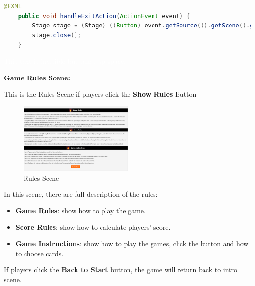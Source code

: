 \documentclass[conference]{IEEEtran}
\begin{document}
\vspace{0.5cm}

\begin{lstlisting}[language = Java, caption = Exit Button, basicstyle=\footnotesize, frame=single, framesep=1pt, framerule=0.5pt, xleftmargin=8pt, xrightmargin=8pt ]
    @FXML
    public void handleExitAction(ActionEvent event) {
        Stage stage = (Stage) ((Button) event.getSource()).getScene().getWindow();
        stage.close();
    }
\end{lstlisting}

\textcolor{white}{This text is invisible but takes up space.} \\

\newpage
    
\textbf{Game Rules Scene:}

This is the Rules Scene if players click the \textbf{Show Rules} Button
\begin{figure}[h!]
    \centering
    \includegraphics[width=0.5\textwidth]{img/Screenshot 2025-01-14 111830.png} %
    \caption{Rules Scene}
    \label{fig:rule-scene}
\end{figure}

In this scene, there are full description of the rules:
\begin{itemize}
    \item \textbf{Game Rules}: show how to play the game.
    \item \textbf{Score Rules}: show how to calculate players' score.
    \item \textbf{Game Instructions}: show how to play the games, click the button and how to choose cards.
\end{itemize}
If players click the \textbf{Back to Start} button, the game will return back to intro scene.
\end{document}
